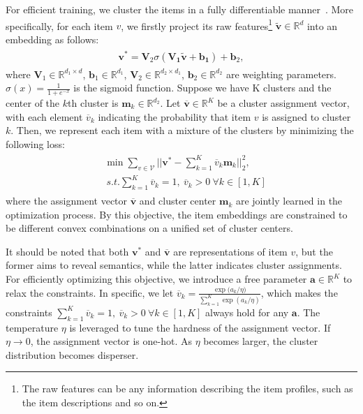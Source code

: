 \documentclass[conference]{IEEEtran}
\theoremstyle{definition}
\theoremstyle{theorem}
\theoremstyle{proof}
\theoremstyle{remark}
\begin{document}
For efficient training, we cluster the items in a fully differentiable manner~\cite{yang2016joint,yang2017towards}.
More specifically, for each item $v$, we firstly project its raw features\footnote{{The raw features can be any information describing the item profiles, such as the item descriptions and so on.}} $\tilde{\bm{v}}\in \mathbb{R}^{d}$ into an embedding as follows:
	\begin{eqnarray}\label{encoder}
		\begin{aligned}
			{\bm{v}^*} = \bm{V}_2\sigma(\bm{\bm{V}_1\tilde{\bm{v}}+\bm{b}_1})+\bm{b}_2,
		\end{aligned}
	\end{eqnarray}
where
$\bm{V}_1\in \mathbb{R}^{d_1\times d}$, $\bm{b}_1\in \mathbb{R}^{d_1}$, $\bm{V}_2\in \mathbb{R}^{d_2\times d_1}$, $\bm{b}_2\in \mathbb{R}^{d_2}$ are weighting parameters. $\sigma(x) = \frac{1}{1+e^{-x}}$ is the sigmoid function.
Suppose we have K clusters and the center of the $k$th cluster is $\bm{m}_k\in \mathbb{R}^{d_2}$.
Let $\overline{\bm{v}}\in \mathbb{R}^{K}$ be a cluster assignment vector, with each element $\overline{{v}}_k$ indicating the probability that item $v$ is assigned to cluster $k$. 
Then, we represent each item with a mixture of the clusters by minimizing the following loss:
	\begin{eqnarray}\label{deepclu}
		\begin{aligned}
			&\min \!\sum_{v\in \mathcal{V}}\!||\bm{v}^*\!-\!\sum_{k=1}^K \overline{{v}}_k\bm{m}_k||^2_2, \\
			&~s.t. \sum_{k=1}^K \overline{{v}}_k\!=\!1,~\overline{{v}}_k\!>\!0~\forall k\!\in\![1,K]
		\end{aligned}
	\end{eqnarray}
where the assignment vector $\overline{\bm{v}}$ and cluster center $\bm{m}_k$ are jointly learned in the optimization process.
By this objective, the item embeddings are constrained to be different convex combinations on a unified set of cluster centers.

It should be noted that both $\bm{v}^*$ and $\overline{\bm{v}}$ are representations of item $v$, but the former aims to reveal semantics, while the latter indicates cluster assignments.
For efficiently optimizing this objective, we introduce a free parameter $\bm{a}\in \mathbb{R}^{K}$ to relax the constraints.
In specific, we let $\overline{{v}}_k = \frac{\exp{({a}_k/\eta}) }{\sum_{k=1}^{K} \exp{(a_k/\eta) }}$,
which makes the constraints $\sum_{k=1}^K \overline{{v}}_k\!=\!1,~\overline{{v}}_k\!>\!0~\forall k\!\in\![1,K]$ always hold for any $\bm{a}$.
The temperature $\eta$ is leveraged to tune the hardness of the assignment vector.
If $\eta\rightarrow 0$, the assignment vector is one-hot. As $\eta$ becomes larger, the cluster distribution becomes disperser. 
\end{document}
